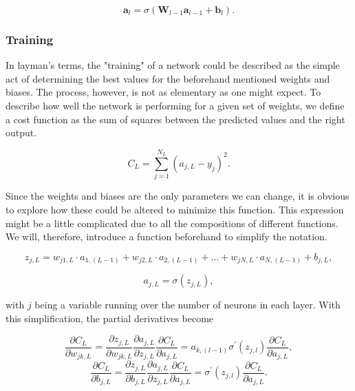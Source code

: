 \begin{equation}
\mathbf{a}_l=\sigma\left(\mathbf{W}_{l-1} \mathbf{a}_{l-1}+\mathbf{b}_{l}\right).
\end{equation}
 

\subsubsection*{Training}

In layman's terms, the "training" of a network could be described as the simple act of determining the best values for the beforehand mentioned weights and biases. The process, however, is not as elementary as one might expect. To describe how well the network is performing for a given set of weights, we define a cost function as the sum of squares between the predicted values and the right output.

\begin{equation}
C_L=\sum_{j=1}^{N_L}\left(a_{j,L}-y_j\right)^2.
\end{equation}

Since the weights and biases are the only parameters we can change, it is obvious to explore how these could be altered to minimize this function. This expression might be a little complicated due to all the compositions of different functions. We will, therefore, introduce a function beforehand to simplify the notation. 

\begin{equation}
z_{j,L}=w_{j 1,L} \cdot a_{1,(L-1)}+w_{j 2,L} \cdot a_{2,(L-1)}+ \hdots + w_{j N,L} \cdot a_{N,(L-1)}+b_{j,L},
\end{equation}

\begin{equation}
a_{j,L}=\sigma\left(z_{j,L}\right),
\end{equation}

with $j$ being a variable running over the number of neurons in each layer. With this simplification, the partial derivatives become

\begin{equation}
\frac{\partial C_L}{\partial w_{j k,L}}=\frac{\partial z_{j,L}}{\partial w_{j k,L}} \frac{\partial a_{j,L}}{\partial z_{j,L}} \frac{\partial C_L}{\partial a_{j,L}} = a_{k,(l-1)}\sigma^\prime (z_{j,l}) \frac{\partial C_L}{\partial a_{j,L}},
\end{equation}
\begin{equation}
\frac{\partial C_L}{\partial b_{j,L}}=\frac{\partial z_{j,L}}{\partial b_{j,L}} \frac{\partial a_{j,L}}{\partial z_{j,L}} \frac{\partial C_L}{\partial a_{j,L}} = \sigma^\prime (z_{j,l}) \frac{\partial C_L}{\partial a_{j,L}}.
\end{equation}

